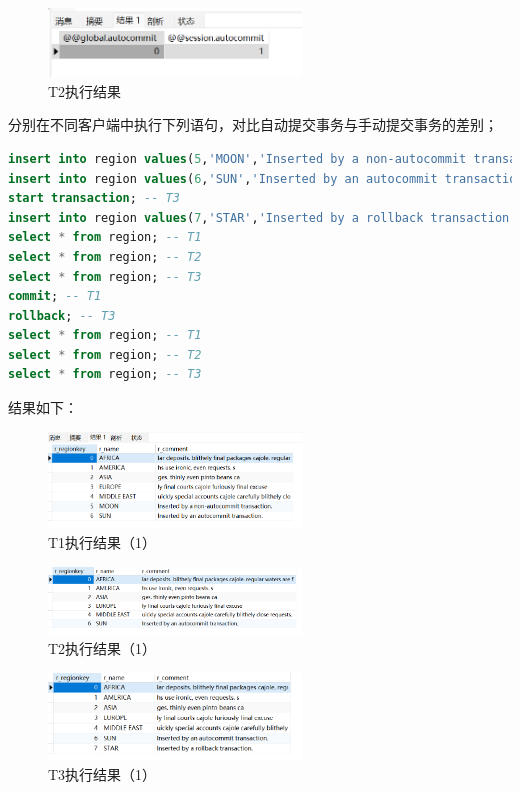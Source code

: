 \documentclass{article}
\begin{document}
\begin{figure}[H]
  \centering
  \includegraphics[width=0.6\textwidth]{img/6.png}
  \caption{T2执行结果}
\end{figure}

分别在不同客户端中执行下列语句，对比自动提交事务与手动提交事务的差别；

\begin{lstlisting}[language=sql]
insert into region values(5,'MOON','Inserted by a non-autocommit transaction.'); -- T1
insert into region values(6,'SUN','Inserted by an autocommit transaction.'); -- T2
start transaction; -- T3
insert into region values(7,'STAR','Inserted by a rollback transaction.'); -- T3
select * from region; -- T1
select * from region; -- T2
select * from region; -- T3
commit; -- T1
rollback; -- T3
select * from region; -- T1
select * from region; -- T2
select * from region; -- T3
\end{lstlisting}

结果如下：

\begin{figure}[H]
  \centering
  \includegraphics[width=0.6\textwidth]{img/7.png}
  \caption{T1执行结果（1）}
\end{figure}

\begin{figure}[H]
  \centering
  \includegraphics[width=0.6\textwidth]{img/8.png}
  \caption{T2执行结果（1）}
\end{figure}

\begin{figure}[H]
  \centering
  \includegraphics[width=0.6\textwidth]{img/9.png}
  \caption{T3执行结果（1）}
\end{figure}
\end{document}
